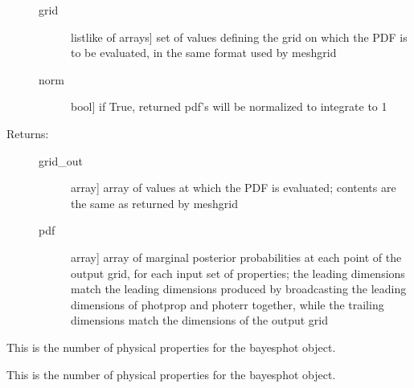 \documentclass[letterpaper,10pt,english]{sphinxmanual}
\begin{document}
\begin{fulllineitems}
\begin{fulllineitems}
\begin{description}
\begin{description}
\item[{grid}] \leavevmode{[}listlike of arrays{]}
set of values defining the grid on which the PDF is to
be evaluated, in the same format used by meshgrid

\item[{norm}] \leavevmode{[}bool{]}
if True, returned pdf’s will be normalized to integrate
to 1

\end{description}

\item[{Returns:}] \leavevmode\begin{description}
\item[{grid\_out}] \leavevmode{[}array{]}
array of values at which the PDF is evaluated; contents
are the same as returned by meshgrid

\item[{pdf}] \leavevmode{[}array{]}
array of marginal posterior probabilities at each point
of the output grid, for each input set of properties; the leading
dimensions match the leading dimensions produced by
broadcasting the leading dimensions of photprop and
photerr together, while the trailing dimensions match
the dimensions of the output grid

\end{description}

\end{description}

\end{fulllineitems}


\begin{fulllineitems}
\label{\detokenize{bayesphot:slugpy.bayesphot.bp.bp.ndim}}
This is the number of physical properties for the bayesphot
object.

\end{fulllineitems}


\begin{fulllineitems}
\label{\detokenize{bayesphot:slugpy.bayesphot.bp.bp.nphot}}
This is the number of physical properties for the bayesphot
object.

\end{fulllineitems}



\end{fulllineitems}
\end{document}
